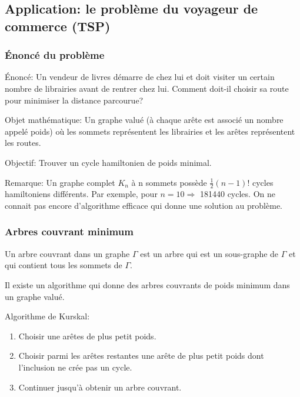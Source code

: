\subsection{Application: le problème du voyageur de commerce (TSP)}

\subsubsection{Énoncé du problème}

Énoncé: Un vendeur de livres démarre de chez lui et doit visiter un certain nombre de librairies avant de rentrer chez lui. Comment doit-il choisir sa route pour minimiser la distance parcourue?  

Objet mathématique: Un graphe valué (à chaque arête est associé un nombre appelé poids) où les sommets représentent les librairies et les arêtes représentent les routes.



Objectif: Trouver un cycle hamiltonien de poids minimal.

Remarque: Un graphe complet $K_{n}$ à n sommets possède $\frac{1}{2}(n-1)!$ cycles hamiltoniens différents. Par exemple, pour $n=10 \Rightarrow$ 181440 cycles. On ne connait pas encore d'algorithme efficace qui donne une solution au problème.

\newpage

\subsubsection{Arbres couvrant minimum}

\begin{defn}
Un arbre couvrant dans un graphe $\Gamma$ est un arbre qui est un sous-graphe de $\Gamma$ et qui contient tous les sommets de $\Gamma$.
\end{defn}

Il existe un algorithme qui donne des arbres couvrants de poids minimum dans un graphe valué.

Algorithme de Kurskal:
\begin{enumerate}[i]
	\item Choisir une arêtes de plus petit poids.
	\item Choisir parmi les arêtes restantes une arête de plus petit poids dont l'inclusion ne crée pas un cycle.
	\item Continuer jusqu'à obtenir un arbre couvrant.
\end{enumerate}

